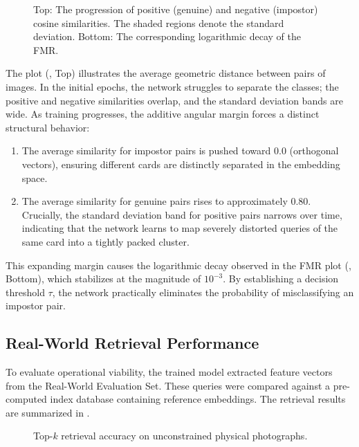 \begin{figure}[H]
    \centering
    
    \caption{Top: The progression of positive (genuine) and negative (impostor) cosine similarities. The shaded regions denote the standard deviation. Bottom: The corresponding logarithmic decay of the \ac{FMR}.}
    \label{fig:training_metric_space}
\end{figure}

The  plot (, Top) illustrates the average geometric distance between pairs of images. In the initial epochs, the network struggles to separate the classes; the positive and negative similarities overlap, and the standard deviation bands are wide. As training progresses, the additive angular margin forces a distinct structural behavior:
\begin{enumerate}
    \item {} The average similarity for impostor pairs is pushed toward $0.0$ (orthogonal vectors), ensuring different cards are distinctly separated in the embedding space.
    \item {} The average similarity for genuine pairs rises to approximately $0.80$. Crucially, the standard deviation band for positive pairs narrows over time, indicating that the network learns to map severely distorted queries of the same card into a tightly packed cluster.
\end{enumerate}

This expanding margin causes the logarithmic decay observed in the \ac{FMR} plot (, Bottom), which stabilizes at the magnitude of $10^{-3}$. By establishing a decision threshold $\tau$, the network practically eliminates the probability of misclassifying an impostor pair.

\subsection{Real-World Retrieval Performance}\label{subsec:exp_real_world}
To evaluate operational viability, the trained model extracted feature vectors from the Real-World Evaluation Set. These queries were compared against a pre-computed index database containing reference embeddings. The retrieval results are summarized in . 

\begin{figure}[H]
    \centering
    
    \caption{Top-$k$ retrieval accuracy on unconstrained physical photographs.}
    \label{fig:acc_barchart}
\end{figure}


